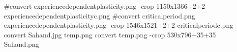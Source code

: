 #convert experiencedependentplasticity.png -crop 1150x1366+2+2 experiencedependentplasticityc.png
#convert criticalperiod.png experiencedependentplasticity.png -crop 1546x1521+2+2 criticalperiodc.png
convert Sahand.jpg temp.png
convert temp.png -crop 530x796+35+35 Sahand.png
